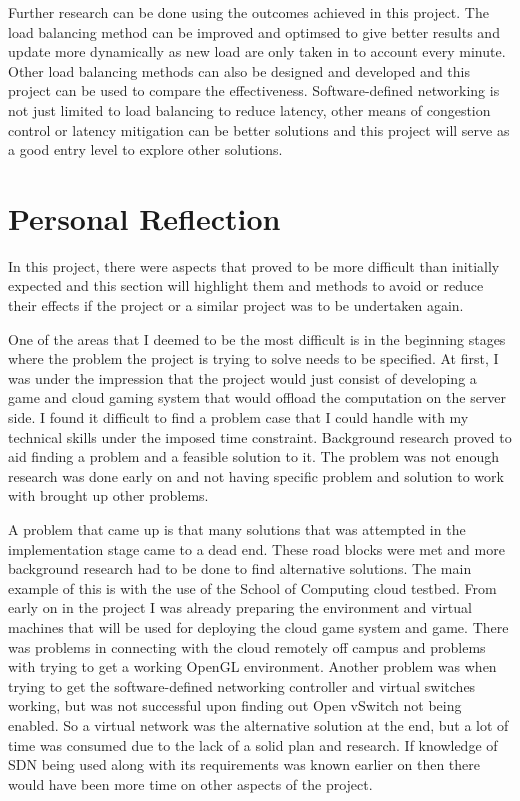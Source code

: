 \newline
\par
Further research can be done using the outcomes achieved in this project. The load balancing method can be improved and optimsed to give better results and update more dynamically as new load are only taken in to account every minute. Other load balancing methods can also be designed and developed and this project can be used to compare the effectiveness. Software-defined networking is not just limited to load balancing to reduce latency, other means of congestion control or latency mitigation can be better solutions and this project will serve as a good entry level to explore other solutions.

\section{Personal Reflection}
In this project, there were aspects that proved to be more difficult than initially expected and this section will highlight them and methods to avoid or reduce their effects if the project or a similar project was to be undertaken again.
\newline
\par
One of the areas that I deemed to be the most difficult is in the beginning stages where the problem the project is trying to solve needs to be specified. At first, I was under the impression that the project would just consist of developing a game and cloud gaming system that would offload the computation on the server side. I found it difficult to find a problem case that I could handle with my technical skills under the imposed time constraint. Background research proved to aid finding a problem and a feasible solution to it. The problem was not enough research was done early on and not having specific problem and solution to work with brought up other problems.
\newline
\par
A problem that came up is that many solutions that was attempted in the implementation stage came to a dead end. These road blocks were met and more background research had to be done to find alternative solutions. The main example of this is with the use of the School of Computing cloud testbed. From early on in the project I was already preparing the environment and virtual machines that will be used for deploying the cloud game system and game. There was problems in connecting with the cloud remotely off campus and problems with trying to get a working OpenGL environment. Another problem was when trying to get the software-defined networking controller and virtual switches working, but was not successful upon finding out Open vSwitch not being enabled. So a virtual network was the alternative solution at the end, but a lot of time was consumed due to the lack of a solid plan and research. If knowledge of SDN being used along with its requirements was known earlier on then there would have been more time on other aspects of the project.

